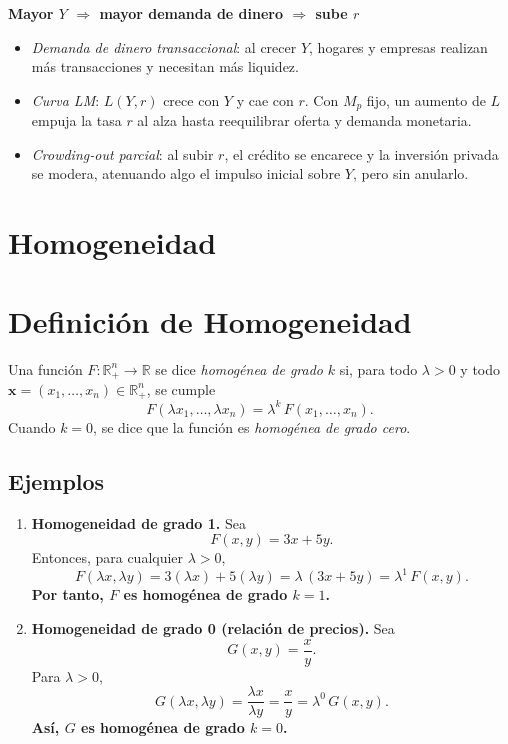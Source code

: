 \documentclass{article}
\begin{document}
\noindent
\textbf{\color{teal}Mayor \(Y\) \(\Rightarrow\) mayor demanda de dinero \(\Rightarrow\) sube \(r\)}
\begin{itemize}
  \item \emph{\color{teal}Demanda de dinero transaccional}: al crecer \(Y\), hogares y empresas realizan más transacciones y necesitan más liquidez.
  \item \emph{\color{teal}Curva LM}: \(L(Y,r)\) crece con \(Y\) y cae con \(r\). Con \(M_p\) fijo, un aumento de \(L\) empuja la tasa \(r\) al alza hasta reequilibrar oferta y demanda monetaria.
  \item \emph{\color{teal}Crowding‑out parcial}: al subir \(r\), el crédito se encarece y la inversión privada se modera, atenuando algo el impulso inicial sobre \(Y\), pero sin anularlo.
\end{itemize}

\newpage

\section{Homogeneidad}

\section*{Definición de Homogeneidad}
Una función \(F:\mathbb{R}^n_{+}\to\mathbb{R}\) se dice \emph{homogénea de grado} \(k\) si, para todo \(\lambda>0\) y todo \(\mathbf{x}=(x_1,\dots,x_n)\in\mathbb{R}^n_{+}\), se cumple
\[
F(\lambda x_1,\dots,\lambda x_n)
=\lambda^k\,F(x_1,\dots,x_n).
\]
Cuando \(k=0\), se dice que la función es \emph{\color{teal} homogénea de grado cero}.


\subsection*{Ejemplos}

\begin{enumerate}
  \item \textbf{Homogeneidad de grado 1.}  
    Sea
    \[
      F(x,y) = 3x + 5y.
    \]
    Entonces, para cualquier \(\lambda>0\),
    \[
      F(\lambda x,\lambda y)
      =3(\lambda x) + 5(\lambda y)
      =\lambda\,(3x+5y)
      =\lambda^1\,F(x,y).
    \]
\textbf{\color{teal}    Por tanto, \(F\) es homogénea de grado \(k=1\).
}
  \item \textbf{Homogeneidad de grado 0 (relación de precios).}  
    Sea
    \[
      G(x,y) = \frac{x}{y}.
    \]
    Para \(\lambda>0\),
    \[
      G(\lambda x,\lambda y)
      =\frac{\lambda x}{\lambda y}
      =\frac{x}{y}
      =\lambda^0\,G(x,y).
    \]
\textbf{  \color{teal}  Así, \(G\) es homogénea de grado \(k=0\).}

\end{enumerate}
\end{document}
